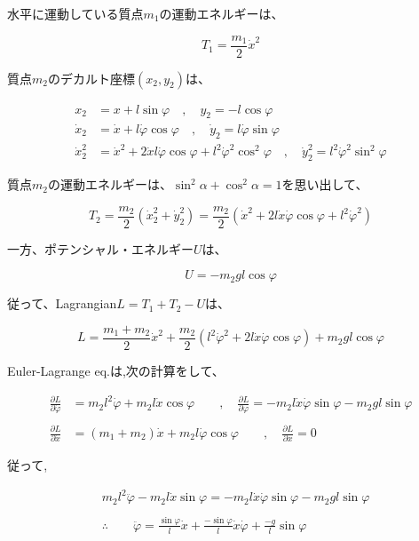 水平に運動している質点$m_1$の運動エネルギーは、

\[T_1 = \displaystyle\frac{m_1}{2}\dot{x}^2\]

質点$m_2$のデカルト座標$(x_2,y_2)$は、

\begin{align*}
   x_2 &= x + l\sin\varphi \quad,\quad y_2 = -l\cos\varphi\\
   \dot{x}_2 &= \dot{x} + l\dot{\varphi}\cos\varphi \quad,\quad \dot{y}_2 = l\dot{\varphi}\sin\varphi\\
   \dot{x}_2^2 &= \dot{x}^2 + 2\dot{x}l\dot{\varphi}\cos\varphi + l^2\dot{\varphi}^2\cos^2\varphi \quad,\quad \dot{y}_2^2 = l^2\dot{\varphi}^2\sin^2\varphi
\end{align*}

質点$m_2$の運動エネルギーは、$\sin^2\alpha+\cos^2\alpha=1$を思い出して、

\[T_2 = \displaystyle\frac{m_2}{2}\left(\dot{x}_2^2+\dot{y}_2^2\right) = \displaystyle\frac{m_2}{2}\left(\dot{x}^2 + 2l\dot{x}\dot{\varphi}\cos\varphi+l^2\dot{\varphi}^2\right)\]

一方、ポテンシャル・エネルギー$U$は、

\[U = -m_2gl\cos\varphi\]

従って、Lagrangian$L=T_1+T_2-U$は、

\[L=\displaystyle\frac{m_1+m_2}{2}\dot{x}^2+\frac{m_2}{2}\left(l^2\dot{\varphi}^2+2l\dot{x}\dot{\varphi}\cos\varphi\right)+m_2gl\cos\varphi\]

Euler-Lagrange eq.は,次の計算をして、

\begin{align*}
   \frac{\partial L}{\partial\dot{\varphi}}&=m_2l^2\dot{\varphi} + m_2l\dot{x}\cos\varphi \qquad,\quad \frac{\partial L}{\partial \varphi} = -m_2l\dot{x}\dot{\varphi}\sin\varphi - m_2gl\sin\varphi\\\\
   \frac{\partial L}{\partial \dot{x}} &= (m_1+m_2)\dot{x} + m_2l\dot{\varphi}\cos\varphi \qquad,\quad \frac{\partial L}{\partial x}=0
\end{align*}

従って,

\begin{align*}
   &m_2l^2\ddot{\varphi}-m_2l\dot{x}\sin\varphi = -m_2l\dot{x}\dot{\varphi}\sin\varphi - m_2gl\sin\varphi\\\\
   &\therefore \qquad \ddot{\varphi} = \frac{\sin\varphi}{l}\dot{x}+\frac{-\sin\varphi}{l}\dot{x}\dot{\varphi}+\frac{-g}{l}\sin\varphi
\end{align*}

